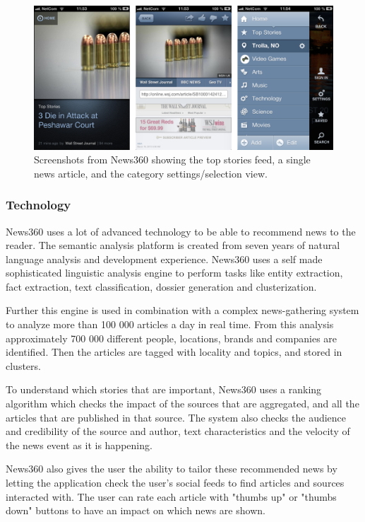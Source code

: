 \begin{figure}[!htbp]
\centering
\includegraphics[width=130mm]{GFX/screenshots/news360.png}
\caption{Screenshots from News360 showing the top stories feed, a single news article, and the category settings/selection view.}
\label{screenshots_news360}
\end{figure}

\subsubsection{Technology}
News360 uses a lot of advanced technology to be able to recommend news to the reader\cite{news360_technology}. The semantic analysis platform is created from seven years of natural language analysis and development experience. News360 uses a self made sophisticated linguistic analysis engine to perform tasks like entity extraction, fact extraction, text classification, dossier generation and clusterization.

Further this engine is used in combination with a complex news-gathering system to analyze more than 100 000 articles a day in real time. From this analysis approximately 700 000 different people, locations, brands and companies are identified. Then the articles are tagged with locality and topics, and stored in clusters.

To understand which stories that are important, News360 uses a ranking algorithm which checks the impact of the sources that are aggregated, and all the articles that are published in that source. The system also checks the audience and credibility of the source and author, text characteristics and the velocity of the news event as it is happening.

News360 also gives the user the ability to tailor these recommended news by letting the application check the user's social feeds to find articles and sources interacted with. The user can rate each article with "thumbs up" or "thumbs down" buttons to have an impact on which news are shown.


